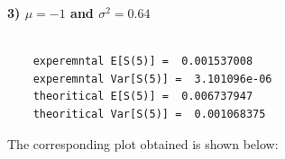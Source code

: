 \documentclass[12pt]{book}
\begin{document}
\begin{figure}[H]
	\centering
\end{figure}
\newpage
\textbf{3) $\mu=-1$ and $\sigma ^2=0.64$}\\\\
\begin{lstlisting}
	experemntal E[S(5)] =  0.001537008 
	experemntal Var[S(5)] =  3.101096e-06 
	theoritical E[S(5)] =  0.006737947 
	theoritical Var[S(5)] =  0.001068375 
\end{lstlisting}
The corresponding plot obtained is shown below:
\begin{figure}[H]
	\centering
\end{figure}
\end{document}
